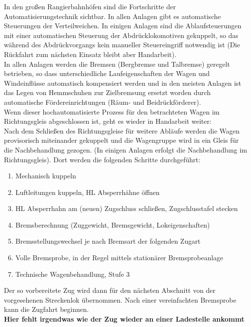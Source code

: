 In den großen Rangierbahnhöfen sind die Fortschritte der Automatisierungstechnik sichtbar. In allen Anlagen gibt es automatische Steuerungen der Verteilweichen. In einigen Anlagen sind die Ablaufsteuerungen mit einer automatischen Steuerung der Abdrücklokomotiven gekuppelt, so das während des Abdrückvorgangs kein manueller Steuereingriff notwendig ist (Die Rückfahrt zum nächsten Einsatz bleibt aber Handarbeit).\\
In allen Anlagen werden die Bremsen (Bergbremse und Talbremse) geregelt betrieben, so dass unterschiedliche Laufeigenschaften der Wagen und Windeinflüsse automatisch kompensiert werden und in den meisten Anlagen ist das Legen von Hemmschuhen zur Zielbremsung ersetzt worden durch automatische Fördereinrichtungen (Räum- und Beidrückförderer).\\
Wenn dieser hochautomatisierte Prozess für den betrachteten Wagen im Richtungsgleis abgeschlossen ist, geht es wieder in Handarbeit weiter:\\
Nach dem Schließen des Richtungsgleise für weitere Abläufe werden die Wagen provisorisch miteinander gekuppelt und die Wagengruppe wird in ein Gleis für die Nachbehandlung gezogen. (In einigen Anlagen erfolgt die Nachbehandlung im Richtungsgleis). Dort werden die folgenden Schritte durchgeführt:
\begin{enumerate}
    \item Mechanisch kuppeln
    \item Luftleitungen kuppeln, HL Absperrhähne öffnen
    \item HL Absperrhahn am (neuen) Zugschluss schließen, Zugschlusstafel stecken
    \item Bremsberechnung (Zuggewicht, Bremsgewicht, Lokeigenschaften)
    \item Bremsstellungswechsel je nach Bremsart der folgenden Zugart
    \item Volle Bremsprobe, in der Regel mittels stationärer Bremsprobeanlage
    \item Technische Wagenbehandlung, Stufe 3
\end{enumerate}
Der so vorbereitete Zug wird dann für den nächsten Abschnitt von der vorgesehenen Streckenlok übernommen. Nach einer vereinfachten Bremsprobe kann die Zugfahrt beginnen.\\
\textbf{Hier fehlt irgendwas wie der Zug wieder an einer Ladestelle ankommt}
